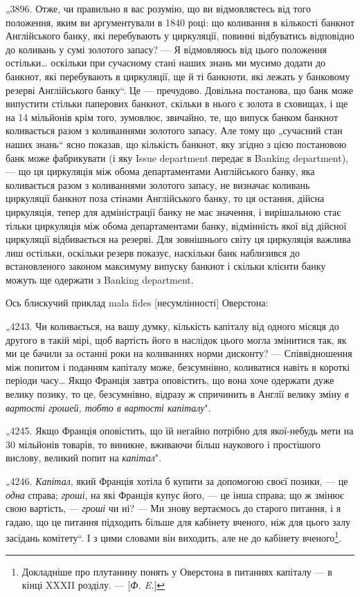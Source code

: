 
„3896. Отже, чи правильно я вас розумію, що ви відмовляєтесь
від того положення, яким ви аргументували в 1840 році: що коливання в кількості банкнот Англійського
банку, які перебувають
у циркуляції, повинні відбуватись відповідно до коливань у сумі
золотого запасу? — Я відмовляюсь від цього положення остільки\dots{}
оскільки при сучасному стані наших знань ми мусимо додати до
банкнот, які перебувають в циркуляції, ще й ті банкноти, які
лежать у банковому резерві Англійського банку“. Це — пречудово. Довільна постанова, що банк може
випустити стільки
паперових банкнот, скільки в нього є золота в сховищах, і ще на
14 мільйонів крім того, зумовлює, звичайно, те, що випуск банком
банкнот коливається разом з коливаннями золотого запасу. Але
тому що „сучасний стан наших знань“ ясно показав, що кількість
банкнот, яку згідно з цією постановою банк може фабрикувати (і яку
Issue department передає в Banking department), — що ця циркуляція
між обома департаментами Англійського банку, яка коливається
разом з коливаннями золотого запасу, не визначає коливань
циркуляції банкнот поза стінами Англійського банку, то ця
остання, дійсна циркуляція, тепер для адміністрації банку не має
значення, і вирішальною стає тільки циркуляція між обома
департаментами банку, відмінність якої від дійсної циркуляції
відбивається на резерві. Для зовнішнього світу ця циркуляція
важлива лиш остільки, оскільки резерв показує, наскільки банк
наблизився до встановленого законом максимуму випуску банкнот і
скільки клієнти банку можуть ще одержати з Banking department.

Ось блискучий приклад mala fides [несумлінності] Оверстона:

„4243. Чи коливається, на вашу думку, кількість капіталу від
одного місяця до другого в такій мірі, щоб вартість його в наслідок цього могла змінитися так, як ми
це бачили за
останні роки на коливаннях норми дисконту? — Співвідношення
між попитом і поданням капіталу може, безсумнівно, коливатися навіть в короткі періоди часу\dots{} Якщо
Франція завтра оповістить, що вона хоче одержати дуже велику позику, то це, безсумнівно, відразу ж
спричинить в Англії велику зміну \emph{в вартості грошей, тобто в вартості капіталу}".

„4245. Якщо Франція оповістить, що їй негайно потрібно для
якої-небудь мети на 30 мільйонів товарів, то виникне, вживаючи
більш наукового і простішого вислову, великий попит на \emph{капітал}".

„4246. \emph{Капітал}, який Франція хотіла б купити за допомогою
своєї позики, — це \emph{одна} справа; \emph{гроші}, на які Франція купує його, — це інша справа; що ж змінює свою
вартість, — \emph{гроші} чи ні? — Ми знову вертаємось до старого питання, і я гадаю, що це питання
підходить більше для кабінету вченого, ніж для цього залу засідань комітету“. І з цими словами він
виходить, але не
до кабінету вченого\footnote{
Докладніше про плутанину понять у Оверстона в питаннях капіталу — в кінці XXXII розділу. — [\emph{Ф.
E.}]
}.
